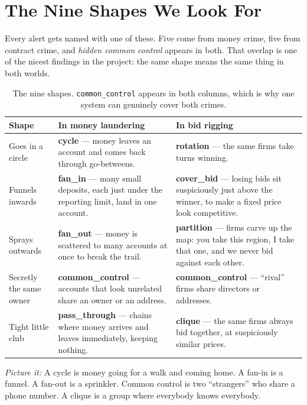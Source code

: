 \documentclass[11pt,a4paper]{article}
\newcommand{\pw}[1]{\textit{\textcolor{accent}{Picture it:}} #1}
\newcommand{\code}[1]{\texttt{\small #1}}
\begin{document}
\section{The Nine Shapes We Look For}

Every alert gets named with one of these. Five come from money crime, five from
contract crime, and \emph{hidden common control} appears in both. That overlap is
one of the nicest findings in the project: the same shape means the same thing in
both worlds.

\begin{table}[h]
\centering
\small
\begin{tabular}{@{}p{2.6cm}p{5.9cm}p{5.9cm}@{}}
\toprule
\textbf{Shape} & \textbf{In money laundering} & \textbf{In bid rigging} \\
\midrule
Goes in a circle & \textbf{cycle} --- money leaves an account and comes back
through go-betweens. &
\textbf{rotation} --- the same firms take turns winning. \\
\addlinespace
Funnels inwards & \textbf{fan\_in} --- many small deposits, each just under the
reporting limit, land in one account. &
\textbf{cover\_bid} --- losing bids sit suspiciously just above the winner, to
make a fixed price look competitive. \\
\addlinespace
Sprays outwards & \textbf{fan\_out} --- money is scattered to many accounts at
once to break the trail. &
\textbf{partition} --- firms carve up the map: you take this region, I take that
one, and we never bid against each other. \\
\addlinespace
Secretly the same owner & \textbf{common\_control} --- accounts that look
unrelated share an owner or an address. &
\textbf{common\_control} --- ``rival'' firms share directors or addresses. \\
\addlinespace
Tight little club & \textbf{pass\_through} --- chains where money arrives and
leaves immediately, keeping nothing. &
\textbf{clique} --- the same firms always bid together, at suspiciously similar
prices. \\
\bottomrule
\end{tabular}
\caption{The nine shapes. \code{common\_control} appears in both columns, which
is why one system can genuinely cover both crimes.}
\label{tab:motifs}
\end{table}

\begin{plain}
\pw{A cycle is money going for a walk and coming home. A fan-in is a funnel. A
fan-out is a sprinkler. Common control is two ``strangers'' who share a phone
number. A clique is a group where everybody knows everybody.}
\end{plain}
\end{document}
